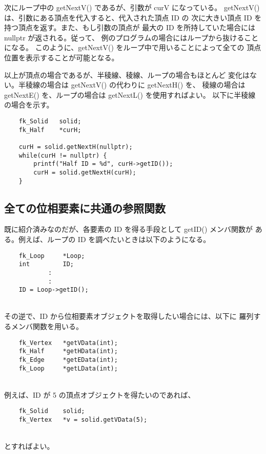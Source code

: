 次にループ中の getNextV() であるが、引数が curV になっている。
getNextV() は、引数にある頂点を代入すると、代入された頂点 ID の
次に大きい頂点 ID を持つ頂点を返す。また、もし引数の頂点が
最大の ID を所持していた場合には nullptr が返される。従って、
例のプログラムの場合にはループから抜けることになる。
このように、getNextV() をループ中で用いることによって全ての
頂点位置を表示することが可能となる。

以上が頂点の場合であるが、半稜線、稜線、ループの場合もほとんど
変化はない。半稜線の場合は getNextV() の代わりに getNextH() を、
稜線の場合は getNextE() を、ループの場合は getNextL() を使用すればよい。
以下に半稜線の場合を示す。
\\
\begin{breakbox}
\begin{verbatim}
    fk_Solid   solid;
    fk_Half    *curH;

    curH = solid.getNextH(nullptr);
    while(curH != nullptr) {
        printf("Half ID = %d", curH->getID());
        curH = solid.getNextH(curH);
    }
\end{verbatim}
\end{breakbox}
\subsection{全ての位相要素に共通の参照関数}
既に紹介済みなのだが、各要素の ID を得る手段として getID() メンバ関数が
ある。例えば、ループの ID を調べたいときは以下のようになる。
\\
\begin{screen}
\begin{verbatim}
    fk_Loop     *Loop;
    int         ID;
            :
            :
    ID = Loop->getID();
\end{verbatim}
\end{screen}
~ \\
その逆で、ID から位相要素オブジェクトを取得したい場合には、以下に
羅列するメンバ関数を用いる。
\\
\begin{screen}
\begin{verbatim}
    fk_Vertex   *getVData(int);
    fk_Half     *getHData(int);
    fk_Edge     *getEData(int);
    fk_Loop     *getLData(int);
\end{verbatim}
\end{screen}
~ \\
例えば、ID が 5 の頂点オブジェクトを得たいのであれば、
\\
\begin{screen}
\begin{verbatim}
    fk_Solid    solid;
    fk_Vertex   *v = solid.getVData(5);
\end{verbatim}
\end{screen}
~ \\
とすればよい。
